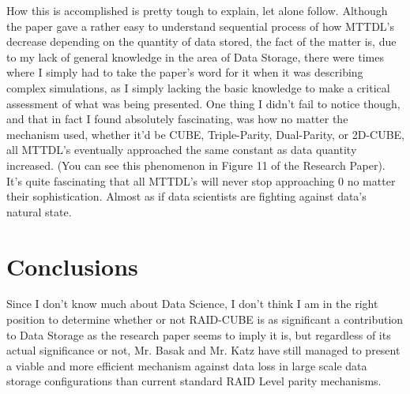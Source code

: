 \documentclass[12pt]{report}
\begin{document}
How this is accomplished is pretty tough to explain, let alone follow. Although the paper gave a rather easy to understand sequential process of how MTTDL's decrease depending on the quantity of data stored, the fact of the matter is, due to my lack of general knowledge in the area of Data Storage, there were times where I simply had to take the paper's word for it when it was describing complex simulations, as I simply lacking the basic knowledge to make a critical assessment of what was being presented. One thing I didn't fail to notice though, and that in fact I found absolutely fascinating, was how no matter the mechanism used, whether it'd be CUBE, Triple-Parity, Dual-Parity, or 2D-CUBE, all MTTDL's eventually approached the same constant as data quantity increased. (You can see this phenomenon in Figure 11 of the Research Paper). It's quite fascinating that all MTTDL's will never stop approaching 0 no matter their sophistication. Almost as if data scientists are fighting against data's natural state.

\section{Conclusions}\label{conclusions}
Since I don't know much about Data Science, I don't think I am in the right position to determine whether or not RAID-CUBE is as significant a contribution to Data Storage as the research paper seems to imply it is, but regardless of its actual significance or not, Mr. Basak and Mr. Katz have still managed to present a viable and more efficient mechanism against data loss in large scale data storage configurations than current standard RAID Level parity mechanisms.
\end{document}
